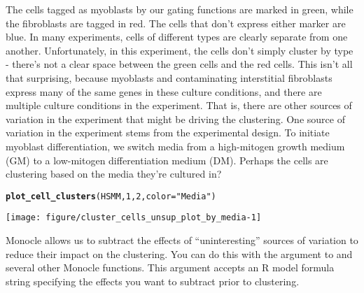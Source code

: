 \documentclass[10pt,oneside]{article}\usepackage[]{graphicx}\usepackage[]{color}
\makeatletter
\def\maxwidth{ %
  \ifdim\Gin@nat@width>\linewidth
    \linewidth
  \else
    \Gin@nat@width
  \fi
}
\newcommand{\hlnum}[1]{\textcolor[rgb]{0.686,0.059,0.569}{#1}}%
\newcommand{\hlstr}[1]{\textcolor[rgb]{0.192,0.494,0.8}{#1}}%
\newcommand{\hlstd}[1]{\textcolor[rgb]{0.345,0.345,0.345}{#1}}%
\newcommand{\hlkwc}[1]{\textcolor[rgb]{0.333,0.667,0.333}{#1}}%
\newcommand{\hlkwd}[1]{\textcolor[rgb]{0.737,0.353,0.396}{\textbf{#1}}}%
\newenvironment{kframe}{%
 \def\at@end@of@kframe{}%
 \ifinner\ifhmode%
  \def\at@end@of@kframe{\end{minipage}}%
  \begin{minipage}{\columnwidth}%
 \fi\fi%
 \def\FrameCommand##1{\hskip\@totalleftmargin \hskip-\fboxsep
 \colorbox{shadecolor}{##1}\hskip-\fboxsep
     \hskip-\linewidth \hskip-\@totalleftmargin \hskip\columnwidth}%
 \MakeFramed {\advance\hsize-\width
   \@totalleftmargin\z@ \linewidth\hsize
   \@setminipage}}%
 {\par\unskip\endMakeFramed%
 \at@end@of@kframe}
\newenvironment{knitrout}{}{} %
\makeatother
\begin{document}
The cells tagged as myoblasts by our gating functions are marked in green, while the fibroblasts are tagged in red. The cells that don't express either marker are blue. In many experiments, cells of different types are clearly separate from one another. Unfortunately, in this experiment, the cells don't simply cluster by type - there's not a clear space between the green cells and the red cells. This isn't all that surprising, because myoblasts and contaminating interstitial fibroblasts express many of the same genes in these culture conditions, and there are multiple culture conditions in the experiment. That is, there are other sources of variation in the experiment that might be driving the clustering. One source of variation in the experiment stems from the experimental design. To initiate myoblast differentiation, we switch media from a high-mitogen growth medium (GM) to a low-mitogen differentiation medium (DM). Perhaps the cells are clustering based on the media they're cultured in?

\begin{knitrout}
\color{fgcolor}\begin{kframe}
\begin{alltt}
\hlkwd{plot_cell_clusters}\hlstd{(HSMM,} \hlnum{1}\hlstd{,} \hlnum{2}\hlstd{,} \hlkwc{color}\hlstd{=}\hlstr{"Media"}\hlstd{)}
\end{alltt}
\end{kframe}

{\centering \texttt{[image: figure/cluster\_cells\_unsup\_plot\_by\_media-1]} 

}



\end{knitrout}

Monocle allows us to subtract the effects of ``uninteresting'' sources of variation to reduce their impact on the clustering. You can do this with the  argument to  and several other Monocle functions. This argument accepts an R model formula string specifying the effects you want to subtract prior to clustering.
\end{document}
